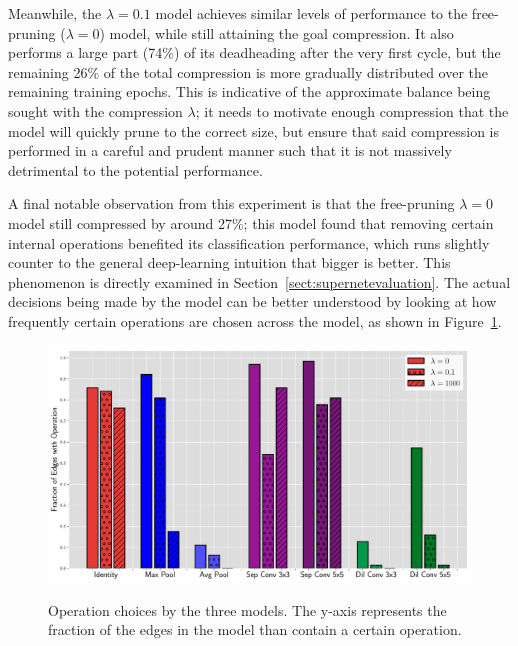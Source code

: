 Meanwhile, the $\lambda=0.1$ model achieves similar levels of performance to the free-pruning ($\lambda=0$) model, while still attaining
the goal compression. It also performs a large part (74\%) of its deadheading after the very first cycle,
but the remaining 26\% of the total compression is more gradually distributed over the remaining training epochs.
This is indicative of the approximate balance being sought with the compression $\lambda$; it needs to
motivate enough compression that the model will quickly prune to the correct size, but ensure that
said compression is performed in a careful and prudent manner such that it is not massively detrimental to the potential performance.

A final notable observation from this experiment is that the free-pruning $\lambda=0$ model still compressed by around
27\%; this model found that removing certain internal operations benefited its classification performance, which runs
slightly counter to the general deep-learning intuition that bigger is better. This phenomenon is directly examined in
Section~\ref{sect:supernetevaluation}. The actual decisions being made by the model can be better understood by looking at how frequently certain operations
are chosen across the model, as shown in Figure~\ref{fig:operation_hist}.

\begin{figure}[ht]
    \centering
	\includegraphics[width=\textwidth]{lambda_exps/joint_operation_spread} \\
	\caption[Operation choices frequencies by $\lambda$ value]{Operation choices by the three models. The y-axis represents the fraction of the edges in the model than
	contain a certain operation. }
	\label{fig:operation_hist}
\end{figure}

